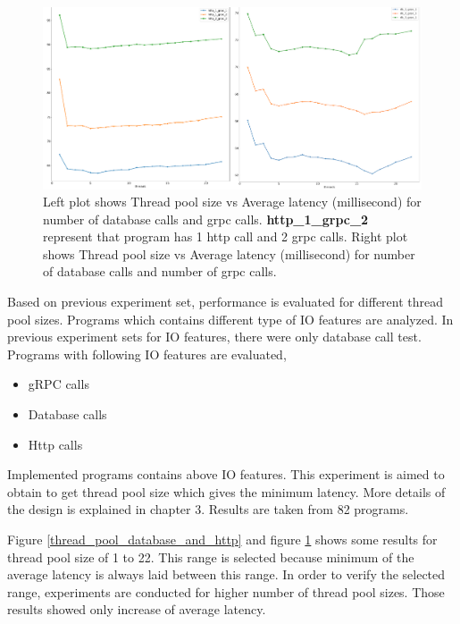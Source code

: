 \begin{figure}[htbp]
	\begin{center}
		\includegraphics[scale=1]{figures/pool-http-db-db-grpc.png}
	\end{center}
	\caption{Left plot shows Thread pool size vs Average latency (millisecond) for number of database calls and grpc calls. \textbf{http\_1\_grpc\_2} represent that program has 1 http call and 2 grpc calls. Right plot shows Thread pool size vs Average latency (millisecond) for number of database calls and number of grpc calls.}
	\label{thread_pool_http_db_and_db_grpc}
\end{figure}

Based on previous experiment set, performance is evaluated for different thread pool sizes. Programs which contains different type of IO features are analyzed. In previous experiment sets for IO features,  there were only database call test. Programs with following IO features are evaluated,
\begin{itemize}
	\item gRPC calls
	\item Database calls
	\item Http calls
\end{itemize}

Implemented programs contains above IO features. This experiment is aimed to obtain to get thread pool size which gives the minimum latency. More details of the design is explained in chapter 3. Results are taken from  82 programs.

Figure \ref{thread_pool_database_and_http} and figure \ref{thread_pool_http_db_and_db_grpc} shows some results for thread pool size of 1 to 22. This range is selected because minimum of the average latency is always laid between this range. In order to verify the selected range, experiments are conducted for higher number of thread pool sizes. Those results showed only increase of average latency. 

